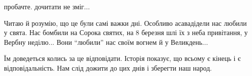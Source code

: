  
 
 
 
 

\qqSecCmt


пробачте. дочитати не зміг...


Читаю й розумію, що це були самі важки дні. Особливо асавадідели нас любили у
свята. Нас бомбили на Сорока святих, на 8 березня шлі їх з неба привітання, у
Вербну неділю... Вони \enquote{любили} нас своїм вогнем й у Великдень...

Їм доведеться колись за це відповідати. Історія показує, що всьому є кінець і є
відповідальність. Нам слід дожити до цих днів і зберегти наш народ.
